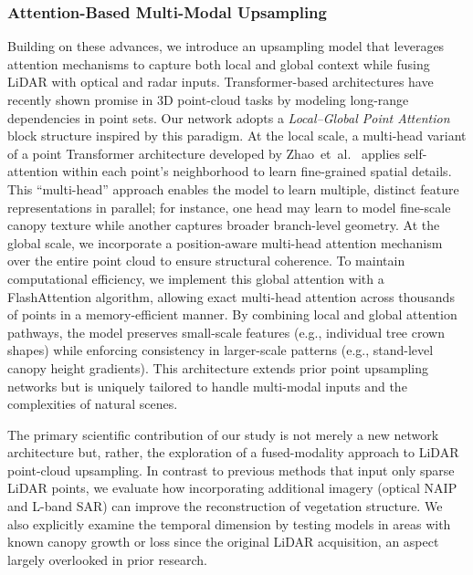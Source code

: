 \documentclass[remotesensing,article,accept,pdftex,moreauthors]{Definitions/mdpi}
\begin{document}
\subsubsection*{Attention-Based
 Multi-Modal Upsampling}

Building on these advances, we introduce an upsampling model that leverages attention mechanisms to capture both local and global context while fusing LiDAR with optical and radar inputs. Transformer-based architectures have recently shown promise in 3D point-cloud tasks by modeling long-range dependencies in point sets. Our network adopts a \emph{Local--Global Point Attention} block structure inspired by this paradigm. At the local scale, a multi-head variant of a point Transformer architecture developed by \mbox{Zhao et al. \cite{zhao2021point}} applies self-attention within each point’s neighborhood to learn fine-grained spatial details. This “multi-head” approach enables the model to learn multiple, distinct feature representations in parallel; for instance, one head may learn to model fine-scale canopy texture while another captures broader branch-level geometry. At the global scale, we incorporate a position-aware multi-head attention mechanism over the entire point cloud to ensure structural coherence. To maintain computational efficiency, we implement this global attention with a FlashAttention \cite{dao2022flashattention} algorithm, allowing exact multi-head attention across thousands of points in a memory-efficient manner. By combining local and global attention pathways, the model preserves small-scale features (e.g., individual tree crown shapes) while enforcing consistency in larger-scale patterns (e.g., stand-level canopy height gradients). This architecture extends prior point upsampling networks but is uniquely tailored to handle multi-modal inputs and the complexities of natural scenes.

The primary scientific contribution of our study is not merely a new network architecture but, rather, the exploration of a fused-modality approach to LiDAR point-cloud upsampling. In contrast to previous methods that input only sparse LiDAR points, we evaluate how incorporating additional imagery (optical NAIP and L-band SAR) can improve the reconstruction of vegetation structure. We also explicitly examine the temporal dimension by testing models in areas with known canopy growth or loss since the original LiDAR acquisition, an aspect largely overlooked in prior research.
\end{document}
